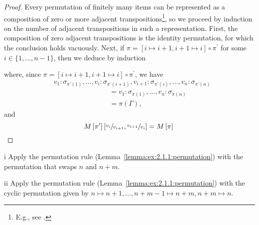\begin{proof}
Every permutation of finitely many items can be represented as a composition of zero or more adjacent transpositions\footnote{E.g., see \cite[Chapter~I, \S5, No.~7, Proposition~9]{BourbakiAlgebraI}.}, so we proceed by induction on the number of adjacent transpositions in such a representation.
First, the composition of zero adjacent transpositions is the identity permutation, for which the conclusion holds vacuously.
Next, if \(\pi = [i \mapsto i + 1, i + 1\mapsto i] \circ \pi^\prime\) for some \(i \in \{1, \ldots, n - 1\}\), then we deduce by induction
\begin{prooftree}
\end{prooftree}
where, since \(\pi = [i \mapsto i + 1, i + 1\mapsto i] \circ \pi^\prime\), we have
\begin{align*}
&v_1 : \sigma_{\pi^\prime(1)}, \ldots, v_i : \sigma_{\pi^\prime(i+1)}, v_{i+1} : \sigma_{\pi^\prime(i)}, \ldots, v_n : \sigma_{\pi^\prime(n)} \\
&\qquad\qquad\qquad\qquad= v_1 : \sigma_{\pi(1)}, \ldots, v_n : \sigma_{\pi(n)} \\
&\qquad\qquad\qquad\qquad= \pi(\Gamma),
\end{align*}
and
\begin{equation*}
M\left[\pi^\prime\right]\left[\sfrac{v_i}{v_{i+1}},\sfrac{v_{i+1}}{v_i}\right]
= M\left[\pi\right]
\qedhere
\end{equation*}
\end{proof}

\begin{partsolution}{i}
Apply the permutation rule (Lemma~\ref{lemma:ex:2.1.1:permutation}) with the permutation that swaps \(n\) and \(n+m\).
\end{partsolution}

\begin{partsolution}{ii}
Apply the permutation rule (Lemma~\ref{lemma:ex:2.1.1:permutation}) with the cyclic permutation
given by \(n \mapsto n + 1, \ldots, n + m - 1 \mapsto n + m, n + m \mapsto n\).
\end{partsolution}

